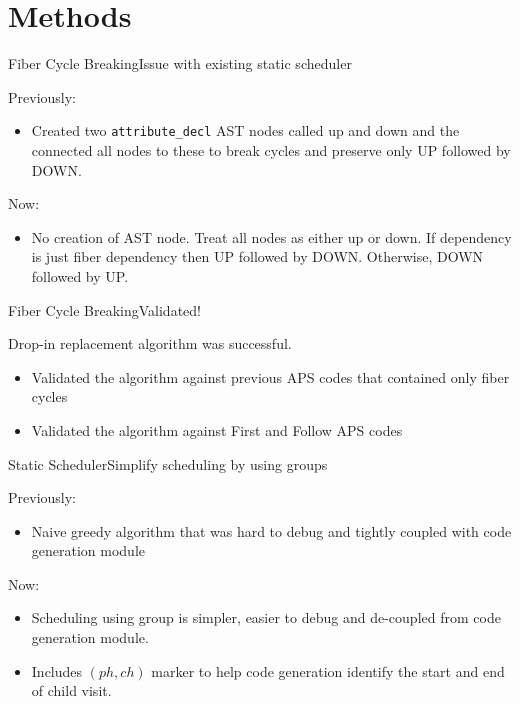 \section{Methods}


\begin{frame}{Fiber Cycle Breaking}{Issue with existing static scheduler}
    
Previously:
\begin{itemize}
    \item Created two \texttt{attribute\_decl} \alert{AST nodes} called up and down and the connected all nodes to these to break cycles and preserve only UP followed by DOWN.
\end{itemize}

Now:

\begin{itemize}
    \item \alert{No creation of AST node}. Treat all nodes as either up or down. If dependency is just fiber dependency then UP followed by DOWN. Otherwise, DOWN followed by UP.
\end{itemize}

\end{frame}


\begin{frame}{Fiber Cycle Breaking}{Validated!}

\alert{Drop-in replacement} algorithm was successful.

\begin{itemize}
    \item Validated the algorithm against \alert{previous APS codes} that contained only fiber cycles
    \item Validated the algorithm against \alert{First and Follow} APS codes 
\end{itemize}

\end{frame}


\begin{frame}{Static Scheduler}{Simplify scheduling by using groups}

Previously:
\begin{itemize}
    \item Naive \alert{greedy algorithm} that was hard to debug and \alert{tightly coupled with code generation} module
\end{itemize}
    
Now:
\begin{itemize}
    \item Scheduling using group is simpler, easier to debug and \alert{de-coupled from code generation} module.
    \item Includes $(\mathit{ph}, \mathit{ch})$ marker to help code generation identify the start and end of child visit.
\end{itemize}

\end{frame}


